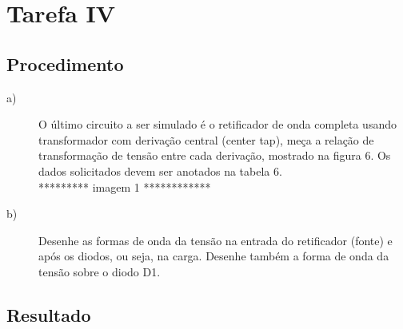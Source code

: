 

\section{Tarefa IV}
\subsection{Procedimento}
\begin{description}
  \item[a)] O \'{u}ltimo circuito a ser simulado \'{e} o retificador de onda completa usando transformador com deriva\c{c}\~{a}o central (center tap), me\c{c}a a rela\c{c}\~{a}o de transforma\c{c}\~{a}o  de tens\~{a}o entre cada deriva\c{c}\~{a}o, mostrado na figura 6.
Os dados solicitados devem ser anotados na tabela 6. \\

********* imagem 1 ************ \\


  \item[b)] Desenhe as formas de onda da tens\~{a}o na entrada do retificador (fonte) e ap\'{o}s os diodos, ou seja, na carga. Desenhe tamb\'{e}m a forma de onda da tens\~{a}o sobre o diodo D1.
\end{description}

\subsection{Resultado}

